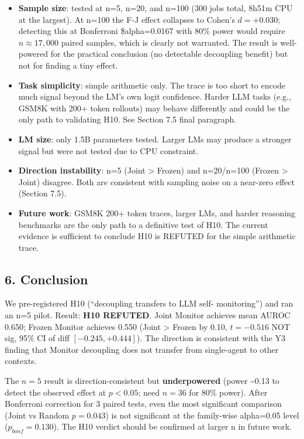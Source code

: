 \documentclass[
]{article}
\providecommand{\tightlist}{%
  \setlength{\itemsep}{0pt}\setlength{\parskip}{0pt}}
\begin{document}
\begin{itemize}
\tightlist
\item
  \textbf{Sample size}: tested at n=5, n=20, and n=100 (300 jobs total,
  8h51m CPU at the largest). At n=100 the F-J effect collapses to
  Cohen's \(d=+0.030\); detecting this at Bonferroni \$alpha=0.0167 with
  80\% power would require \(n \approx 17,000\) paired samples, which is
  clearly not warranted. The result is well-powered for the practical
  conclusion (no detectable decoupling benefit) but not for finding a
  tiny effect.
\item
  \textbf{Task simplicity}: simple arithmetic only. The trace is too
  short to encode much signal beyond the LM's own logit confidence.
  Harder LLM tasks (e.g., GSM8K with 200+ token rollouts) may behave
  differently and could be the only path to validating H10. See Section
  7.5 final paragraph.
\item
  \textbf{LM size}: only 1.5B parameters tested. Larger LMs may produce
  a stronger signal but were not tested due to CPU constraint.
\item
  \textbf{Direction instability}: n=5 (Joint \textgreater{} Frozen) and
  n=20/n=100 (Frozen \textgreater{} Joint) disagree. Both are consistent
  with sampling noise on a near-zero effect (Section 7.5).
\item
  \textbf{Future work}: GSM8K 200+ token traces, larger LMs, and harder
  reasoning benchmarks are the only path to a definitive test of H10.
  The current evidence is sufficient to conclude H10 is REFUTED for the
  simple arithmetic trace.
\end{itemize}

\subsection{6. Conclusion}\label{conclusion}

We pre-registered H10 (``decoupling transfers to LLM self- monitoring'')
and ran an n=5 pilot. Result: \textbf{H10 REFUTED}. Joint Monitor
achieves mean AUROC 0.650; Frozen Monitor achieves 0.550 (Joint
\textgreater{} Frozen by 0.10, \(t=-0.516\) NOT sig, 95\% CI of diff
\([-0.245, +0.444]\)). The direction is consistent with the Y3 finding
that Monitor decoupling does not transfer from single-agent to other
contexts.

The \(n=5\) result is direction-consistent but \textbf{underpowered}
(power \textasciitilde0.13 to detect the observed effect at \(p<0.05\);
need \(n=36\) for 80\% power). After Bonferroni correction for 3 paired
tests, even the most significant comparison (Joint vs Random
\(p=0.043\)) is not significant at the family-wise alpha=0.05 level
(\(p_{bonf}=0.130\)). The H10 verdict should be confirmed at larger n in
future work.
\end{document}
